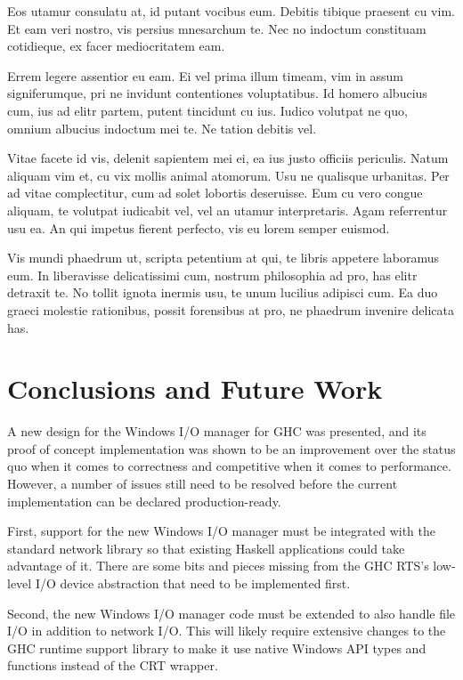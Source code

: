 \documentclass[a4paper,11pt,oneside]{report}
\begin{document}
Eos utamur consulatu at, id putant vocibus eum. Debitis tibique praesent cu
vim. Et eam veri nostro, vis persius mnesarchum te. Nec no indoctum constituam
cotidieque, ex facer mediocritatem eam.

Errem legere assentior eu eam. Ei vel prima illum timeam, vim in assum
signiferumque, pri ne invidunt contentiones voluptatibus. Id homero albucius
cum, ius ad elitr partem, putent tincidunt cu ius. Iudico volutpat ne quo,
omnium albucius indoctum mei te. Ne tation debitis vel.

Vitae facete id vis, delenit sapientem mei ei, ea ius justo officiis
periculis. Natum aliquam vim et, cu vix mollis animal atomorum. Usu ne qualisque
urbanitas. Per ad vitae complectitur, cum ad solet lobortis deseruisse. Eum cu
vero congue aliquam, te volutpat iudicabit vel, vel an utamur
interpretaris. Agam referrentur usu ea. An qui impetus fierent perfecto, vis eu
lorem semper euismod.

Vis mundi phaedrum ut, scripta petentium at qui, te libris appetere laboramus
eum. In liberavisse delicatissimi cum, nostrum philosophia ad pro, has elitr
detraxit te. No tollit ignota inermis usu, te unum lucilius adipisci cum. Ea duo
graeci molestie rationibus, possit forensibus at pro, ne phaedrum invenire
delicata has.


\chapter{Conclusions and Future Work}
\label{chap:conclusions}

A new design for the Windows I/O manager for GHC was presented, and its proof of
concept implementation was shown to be an improvement over the status quo when
it comes to correctness and competitive when it comes to performance. However, a
number of issues still need to be resolved before the current implementation can
be declared production-ready.

First, support for the new Windows I/O manager must be integrated with the
standard network library so that existing Haskell applications could take
advantage of it. There are some bits and pieces missing from the GHC RTS's
low-level I/O device abstraction that need to be implemented first.

Second, the new Windows I/O manager code must be extended to also handle file
I/O in addition to network I/O. This will likely require extensive changes to
the GHC runtime support library to make it use native Windows API types and
functions instead of the CRT wrapper.
\end{document}
